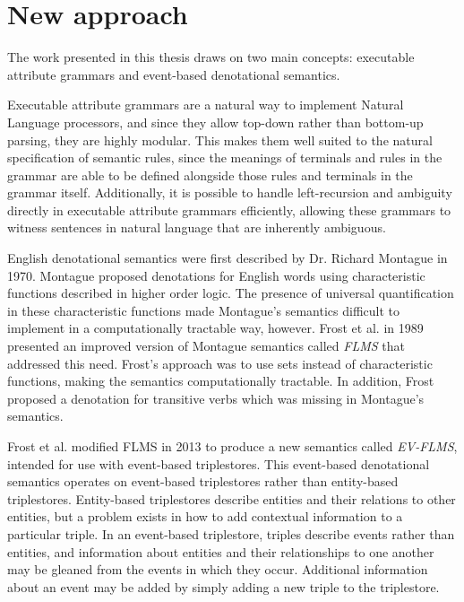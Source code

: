 \documentclass[../main.tex]{subfiles}
\begin{document}
\section {New approach}

The work presented in this thesis draws on two main concepts: executable attribute grammars\cite{frosthafiz2008} and event-based denotational semantics\cite{frostagboola2014}.

Executable attribute grammars are a natural way to implement Natural Language processors\cite{frost1992constructing}, and since they allow top-down rather than bottom-up parsing, they are highly modular\cite{frosthafiz2008}.  This makes them well suited to the natural specification of semantic rules, since the meanings of terminals and rules in the grammar are able to be defined alongside those rules and terminals in the grammar itself.  Additionally, it is possible to handle left-recursion and ambiguity directly in executable attribute grammars efficiently, allowing these grammars to witness sentences in natural language that are inherently ambiguous.

English denotational semantics were first described by Dr. Richard Montague in 1970\cite{dowty2012introduction}.  Montague proposed
denotations for English words using characteristic functions described in higher order logic.
The presence of universal quantification in these characteristic functions made Montague's semantics difficult to implement in a computationally tractable way, however.
Frost et al. in 1989 presented an improved version of Montague semantics called {\em FLMS}\cite{frost1989constructing} that addressed this need.  Frost's approach was to use sets instead of characteristic functions, making the semantics computationally tractable.  In addition, Frost proposed a denotation for transitive verbs which was missing in Montague's semantics\cite{frost2013event}.

Frost et al. modified FLMS in 2013 to produce a new semantics called {\em EV-FLMS}\cite{frost2013event}, intended for use with event-based triplestores.
This event-based denotational semantics operates on event-based triplestores\cite{frost2014demonstration} rather than entity-based triplestores.  Entity-based triplestores describe entities and their relations to other entities, but a problem exists in how to add contextual information to a particular triple.  In an event-based triplestore, triples describe events rather than entities, and information about entities and their relationships to one another may be gleaned from the events in which they occur.  Additional information about an event may be added by simply adding a new triple to the triplestore.
\end{document}
